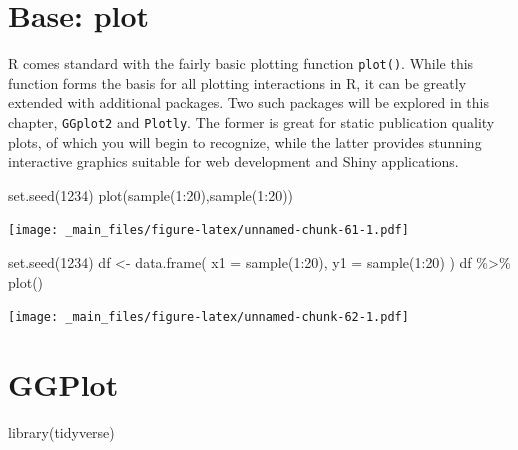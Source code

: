 \documentclass[
]{book}
\newenvironment{Shaded}{\begin{snugshade}}{\end{snugshade}}
\newcommand{\AttributeTok}[1]{\textcolor[rgb]{0.77,0.63,0.00}{#1}}
\newcommand{\DecValTok}[1]{\textcolor[rgb]{0.00,0.00,0.81}{#1}}
\newcommand{\FunctionTok}[1]{\textcolor[rgb]{0.00,0.00,0.00}{#1}}
\newcommand{\NormalTok}[1]{#1}
\newcommand{\OtherTok}[1]{\textcolor[rgb]{0.56,0.35,0.01}{#1}}
\newcommand{\SpecialCharTok}[1]{\textcolor[rgb]{0.00,0.00,0.00}{#1}}
\newcommand{\StringTok}[1]{\textcolor[rgb]{0.31,0.60,0.02}{#1}}
\begin{document}
\hypertarget{base-plot}{%
\section{Base: plot}\label{base-plot}}

R comes standard with the fairly basic plotting function \texttt{plot()}. While this function forms the basis for all plotting interactions in R, it can be greatly extended with additional packages. Two such packages will be explored in this chapter, \texttt{GGplot2} and \texttt{Plotly}. The former is great for static publication quality plots, of which you will begin to recognize, while the latter provides stunning interactive graphics suitable for web development and Shiny applications.

\begin{Shaded}
\begin{Highlighting}[]
\FunctionTok{set.seed}\NormalTok{(}\DecValTok{1234}\NormalTok{)}
\FunctionTok{plot}\NormalTok{(}\FunctionTok{sample}\NormalTok{(}\DecValTok{1}\SpecialCharTok{:}\DecValTok{20}\NormalTok{),}\FunctionTok{sample}\NormalTok{(}\DecValTok{1}\SpecialCharTok{:}\DecValTok{20}\NormalTok{))}
\end{Highlighting}
\end{Shaded}

\texttt{[image: \_main\_files/figure-latex/unnamed-chunk-61-1.pdf]}

\begin{Shaded}
\begin{Highlighting}[]
\FunctionTok{set.seed}\NormalTok{(}\DecValTok{1234}\NormalTok{)}
\NormalTok{df }\OtherTok{\textless{}{-}} \FunctionTok{data.frame}\NormalTok{( }\AttributeTok{x1 =} \FunctionTok{sample}\NormalTok{(}\DecValTok{1}\SpecialCharTok{:}\DecValTok{20}\NormalTok{), }\AttributeTok{y1 =} \FunctionTok{sample}\NormalTok{(}\DecValTok{1}\SpecialCharTok{:}\DecValTok{20}\NormalTok{) )}
\NormalTok{df }\SpecialCharTok{\%\textgreater{}\%} \FunctionTok{plot}\NormalTok{()}
\end{Highlighting}
\end{Shaded}

\texttt{[image: \_main\_files/figure-latex/unnamed-chunk-62-1.pdf]}

\hypertarget{ggplot}{%
\section{GGPlot}\label{ggplot}}

\begin{Shaded}
\begin{Highlighting}[]
\FunctionTok{library}\NormalTok{(}\StringTok{\textquotesingle{}tidyverse\textquotesingle{}}\NormalTok{)}
\end{Highlighting}
\end{Shaded}
\end{document}
